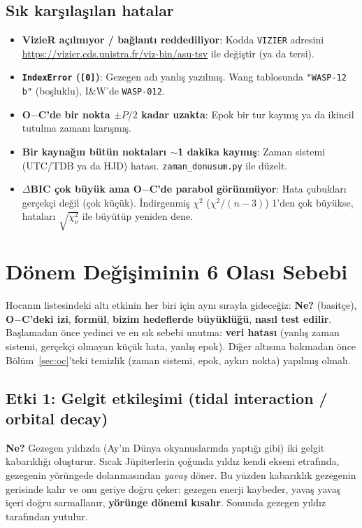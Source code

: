 \subsection{Sık karşılaşılan hatalar}
\begin{itemize}[leftmargin=*]
\item \textbf{VizieR açılmıyor / bağlantı reddediliyor}: Kodda \texttt{VIZIER} adresini
      \url{https://vizier.cds.unistra.fr/viz-bin/asu-tsv} ile değiştir (ya da tersi).
\item \textbf{\texttt{IndexError} (\texttt{[0]})}: Gezegen adı yanlış yazılmış. Wang tablosunda \texttt{"WASP-12 b"}
      (boşluklu), I\&W'de \texttt{WASP-012}.
\item \textbf{O$-$C'de bir nokta $\pm P/2$ kadar uzakta}: Epok bir tur kaymış ya da ikincil tutulma zamanı karışmış.
\item \textbf{Bir kaynağın bütün noktaları $\sim$1 dakika kaymış}: Zaman sistemi (UTC/TDB ya da HJD) hatası.
      \texttt{zaman\_donusum.py} ile düzelt.
\item \textbf{$\Delta$BIC çok büyük ama O$-$C'de parabol görünmüyor}: Hata çubukları gerçekçi değil (çok küçük).
      İndirgenmiş $\chi^2$ ($\chi^2/(n-3)$) 1'den çok büyükse, hataları $\sqrt{\chi^2_\nu}$ ile büyütüp yeniden dene.
\end{itemize}

\section{Dönem Değişiminin 6 Olası Sebebi}
\label{sec:etkiler}

Hocanın listesindeki altı etkinin her biri için aynı sırayla gideceğiz: \textbf{Ne?} (basitçe),
\textbf{O$-$C'deki izi}, \textbf{formül}, \textbf{bizim hedeflerde büyüklüğü}, \textbf{nasıl test edilir}.
Başlamadan önce yedinci ve en sık sebebi unutma: \textbf{veri hatası} (yanlış zaman sistemi, gerçekçi olmayan
küçük hata, yanlış epok). Diğer altısına bakmadan önce Bölüm~\ref{sec:oc}'teki temizlik (zaman sistemi, epok, aykırı nokta) yapılmış olmalı.

\subsection{Etki 1: Gelgit etkileşimi (tidal interaction / orbital decay)}
\textbf{Ne?} Gezegen yıldızda (Ay'ın Dünya okyanuslarında yaptığı gibi) iki gelgit kabarıklığı oluşturur. Sıcak
Jüpiterlerin çoğunda yıldız kendi ekseni etrafında, gezegenin yörüngede dolanmasından \emph{yavaş} döner. Bu yüzden
kabarıklık gezegenin gerisinde kalır ve onu geriye doğru çeker: gezegen enerji kaybeder, yavaş yavaş içeri doğru
sarmallanır, \textbf{yörünge dönemi kısalır}. Sonunda gezegen yıldız tarafından yutulur.

